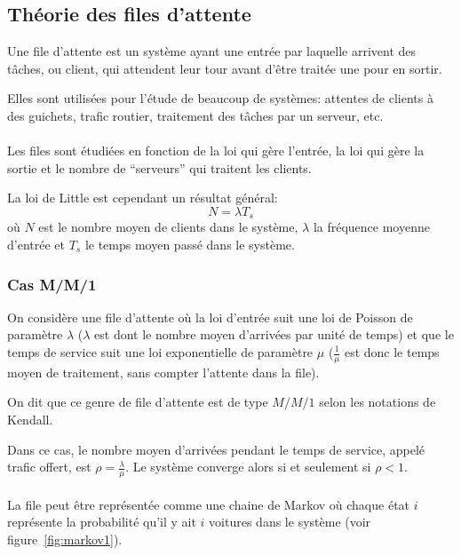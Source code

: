 \subsection{Théorie des files d'attente}
  Une file d'attente est un système ayant une entrée par laquelle arrivent des
  tâches, ou client, qui attendent leur tour avant d'être traitée une pour en
  sortir.

  Elles sont utilisées pour l'étude de beaucoup de systèmes: attentes de
  clients à des guichets, trafic routier, traitement des tâches par un
  serveur, etc.

  \paragraph{}
  Les files sont étudiées en fonction de la loi qui gère l'entrée, la loi qui
  gère la sortie et le nombre de ``serveurs'' qui traitent les clients.

  La loi de Little est cependant un résultat général:
    \[N = \lambda T_s\]
  où $N$ est le nombre moyen de clients dans le système, $\lambda$ la fréquence
  moyenne d'entrée et $T_s$ le temps moyen passé dans le système.

  \subsubsection{Cas M/M/1}
    On considère une file d'attente où la loi d'entrée suit une loi de Poisson
    de paramètre $\lambda$ ($\lambda$ est dont le nombre moyen d'arrivées par
    unité de temps) et que le temps de service suit une loi exponentielle de
    paramètre $\mu$ ($\frac 1 \mu$ est donc le temps moyen de traitement, sans
    compter l'attente dans la file).

    On dit que ce genre de file d'attente est de type $M/M/1$ selon les
    notations de Kendall.

    Dans ce cas, le nombre moyen d'arrivées pendant le temps de service, appelé
    trafic offert, est $\rho = \frac \lambda \mu$. Le système converge alors si
    et seulement si $\rho < 1$.
    
    \paragraph{}
    La file peut être représentée comme une chaine de Markov où chaque état $i$
    représente la probabilité qu'il y ait $i$ voitures dans le système (voir
    figure~\ref{fig:markov1}).

